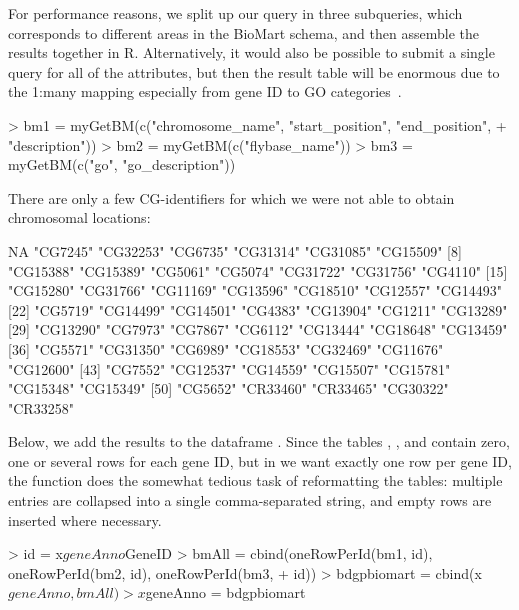 % 
For performance reasons, we split up our query in three subqueries,
which corresponds to different areas in the BioMart schema, and then
assemble the results together in R.  Alternatively, it would also be
possible to submit a single query for all of the attributes, but then
the result table will be enormous due to the 1:many mapping
especially from gene ID to GO categories~\cite{GO}.
%
\begin{Schunk}
\begin{Sinput}
> bm1 = myGetBM(c("chromosome_name", "start_position", "end_position", 
+     "description"))
> bm2 = myGetBM(c("flybase_name"))
> bm3 = myGetBM(c("go", "go_description"))
\end{Sinput}
\end{Schunk}
%
There are only a few CG-identifiers for which we were not able to
obtain chromosomal locations: 
%
\begin{Schunk}
\begin{Soutput}
 [1] NA        "CG7245"  "CG32253" "CG6735"  "CG31314" "CG31085" "CG15509"
 [8] "CG15388" "CG15389" "CG5061"  "CG5074"  "CG31722" "CG31756" "CG4110" 
[15] "CG15280" "CG31766" "CG11169" "CG13596" "CG18510" "CG12557" "CG14493"
[22] "CG5719"  "CG14499" "CG14501" "CG4383"  "CG13904" "CG1211"  "CG13289"
[29] "CG13290" "CG7973"  "CG7867"  "CG6112"  "CG13444" "CG18648" "CG13459"
[36] "CG5571"  "CG31350" "CG6989"  "CG18553" "CG32469" "CG11676" "CG12600"
[43] "CG7552"  "CG12537" "CG14559" "CG15507" "CG15781" "CG15348" "CG15349"
[50] "CG5652"  "CR33460" "CR33465" "CG30322" "CR33258"
\end{Soutput}
\end{Schunk}
%
Below, we add the results
to the dataframe . Since the tables ,
, and  contain zero, one or several rows for
each gene ID, but in  we want exactly one row per
gene ID, the function  does the somewhat tedious
task of reformatting the tables: multiple entries are collapsed
into a single comma-separated string, and empty rows are inserted
where necessary.
%
\begin{Schunk}
\begin{Sinput}
> id = x$geneAnno$GeneID
> bmAll = cbind(oneRowPerId(bm1, id), oneRowPerId(bm2, id), oneRowPerId(bm3, 
+     id))
> bdgpbiomart = cbind(x$geneAnno, bmAll)
> x$geneAnno = bdgpbiomart
\end{Sinput}
\end{Schunk}



